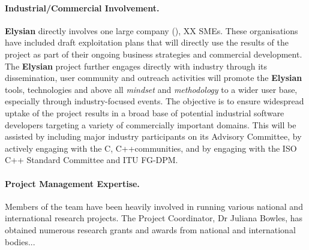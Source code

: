 \documentclass[a4paper,11pt]{article}
\newcommand{\project}[1]{\textbf{#1}\xspace}
\newcommand{\SECURITY}{\project{Elysian}}
\newcommand{\TheProject}{\SECURITY}
\begin{document}
\paragraph{Industrial/Commercial Involvement.}

\TheProject{} directly involves one large company (\IBMshort{}), 
XX SMEs.
These organisations have included draft exploitation plans that will directly use the results of the project
as part of their ongoing business strategies and commercial development.
The \TheProject{} project further engages directly with industry through its
dissemination, user community and outreach activities 
will promote the
\TheProject{} tools, technologies and above all \emph{mindset} and \emph{methodology} to a wider user base,
especially through industry-focused events. %
The objective is to ensure widespread uptake of the project results in a broad base of potential industrial
software developers targeting a variety of commercially important domains. %
This will be assisted by including major industry participants on its Advisory Committee,
by actively engaging with the C, C++communities, and by engaging with the ISO C++ Standard Committee and ITU FG-DPM.


\paragraph{Project Management Expertise.}

Members of the team have been heavily involved in running
various national and international research projects.  The
Project Coordinator, Dr Juliana Bowles, has obtained numerous
research grants and awards from national and international
bodies...
\end{document}

